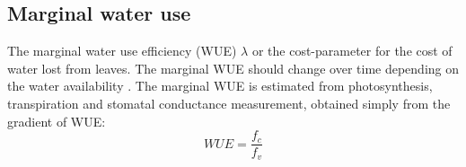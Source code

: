 \subsection{Marginal water use}
%
%
%

The marginal water use efficiency (WUE) $\lambda$ or the cost-parameter for the cost of water lost from leaves. The marginal WUE should change over time depending on the water availability \cite{Manzoni2011}.  The marginal WUE is estimated from photosynthesis, transpiration and stomatal conductance measurement, obtained simply from the gradient of WUE:
\begin{equation}
\textit{WUE} = \frac{f_c}{f_v}
\end{equation}

